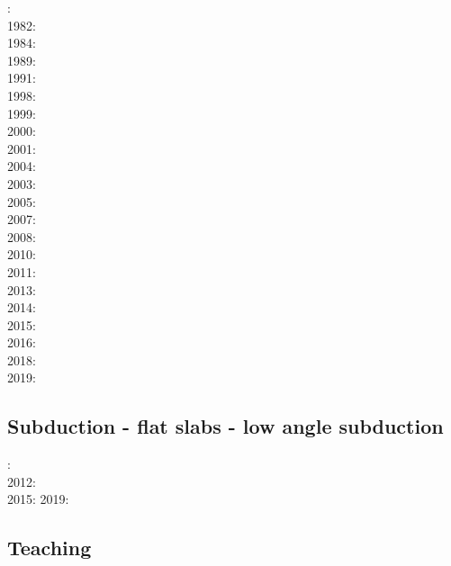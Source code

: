 : \cite{bird78}\\
1982: \cite{clwv82}\\
1984: \cite{cade84}\\
1989: \cite{clwv89}\\
1991: \cite{muph91}\\
1998: \cite{togu98}\\
1999: \cite{fagd99}\\
2000: \cite{pybf00}\\
2001: \cite{dohe01}\cite{reyb01}\cite{brry01}\\
2004: \cite{ster04}\cite{guhl04}\\
2003: \cite{hags03}\\
2005: \cite{bihi05}\\
2007: \cite{kore07}\\
2008: \cite{uegs08}\\
2010: \cite{nigm10}\cite{bucl10}\\
2011: \cite{bagw11}\cite{nigm11}\\
2013: \cite{dyge13}\cite{mana13}\cite{kore13}\\
2014: \cite{recf14}\cite{macg14}\\
2015: \cite{matv15}\cite{pebu15}\cite{vapm15}\\
2016: \cite{crta16}\\
2018: \cite{zhlg18}\cite{basq18}\\
2019: \cite{begb19}\cite{gubg19}\cite{ulcw19}

\subsection*{Subduction - flat slabs - low angle subduction}

: \cite{cube11}\\
2012: \cite{mapm12}\\
2015: \cite{gehm15}\cite{tarn15}
2019: \cite{sifg19}

\subsection*{Teaching} 

\cite{kerh14}


